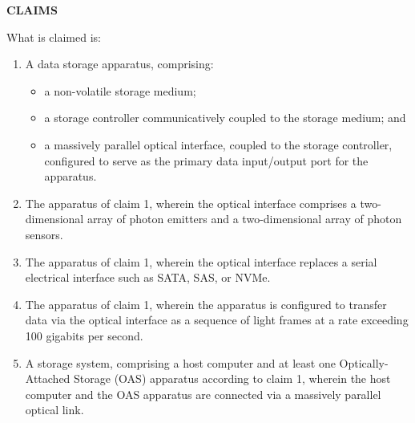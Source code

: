 \documentclass[11pt,letterpaper]{article}
\begin{document}
\thispagestyle{empty}

\begin{center}
    \textbf{\large CLAIMS}
\end{center}

\vspace{0.4cm}
\noindent What is claimed is:

\begin{enumerate}[label=\textbf{\arabic*.}, leftmargin=0.5in, itemsep=0.4cm]
    \item A data storage apparatus, comprising:
    \begin{itemize}[leftmargin=0.3in, noitemsep]
        \item a non-volatile storage medium;
        \item a storage controller communicatively coupled to the storage medium; and
        \item a massively parallel optical interface, coupled to the storage controller, configured to serve as the primary data input/output port for the apparatus.
    \end{itemize}

    \item The apparatus of claim 1, wherein the optical interface comprises a two-dimensional array of photon emitters and a two-dimensional array of photon sensors.

    \item The apparatus of claim 1, wherein the optical interface replaces a serial electrical interface such as SATA, SAS, or NVMe.

    \item The apparatus of claim 1, wherein the apparatus is configured to transfer data via the optical interface as a sequence of light frames at a rate exceeding 100 gigabits per second.

    \item A storage system, comprising a host computer and at least one Optically-Attached Storage (OAS) apparatus according to claim 1, wherein the host computer and the OAS apparatus are connected via a massively parallel optical link.
\end{enumerate}
\end{document}
